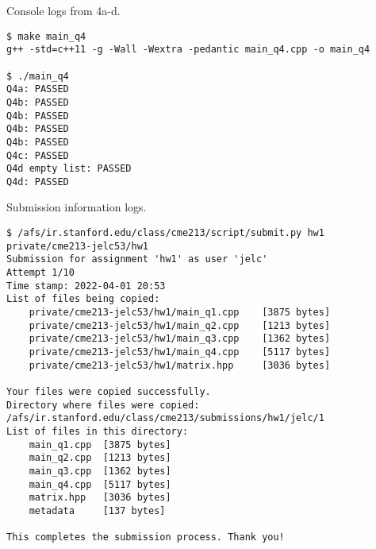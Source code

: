 \documentclass[12pt,letterpaper,twoside]{article}
\begin{document}
Console logs from 4a-d.
\begin{verbatim}
$ make main_q4
g++ -std=c++11 -g -Wall -Wextra -pedantic main_q4.cpp -o main_q4

$ ./main_q4
Q4a: PASSED
Q4b: PASSED
Q4b: PASSED
Q4b: PASSED
Q4b: PASSED
Q4c: PASSED
Q4d empty list: PASSED
Q4d: PASSED
\end{verbatim}

Submission information logs.
\begin{verbatim}
$ /afs/ir.stanford.edu/class/cme213/script/submit.py hw1 private/cme213-jelc53/hw1
Submission for assignment 'hw1' as user 'jelc'
Attempt 1/10
Time stamp: 2022-04-01 20:53
List of files being copied:
    private/cme213-jelc53/hw1/main_q1.cpp	 [3875 bytes]
    private/cme213-jelc53/hw1/main_q2.cpp	 [1213 bytes]
    private/cme213-jelc53/hw1/main_q3.cpp	 [1362 bytes]
    private/cme213-jelc53/hw1/main_q4.cpp	 [5117 bytes]
    private/cme213-jelc53/hw1/matrix.hpp	 [3036 bytes]

Your files were copied successfully.
Directory where files were copied: /afs/ir.stanford.edu/class/cme213/submissions/hw1/jelc/1
List of files in this directory:
    main_q1.cpp	 [3875 bytes]
    main_q2.cpp	 [1213 bytes]
    main_q3.cpp	 [1362 bytes]
    main_q4.cpp	 [5117 bytes]
    matrix.hpp	 [3036 bytes]
    metadata	 [137 bytes]

This completes the submission process. Thank you!
\end{verbatim}
\end{document}
